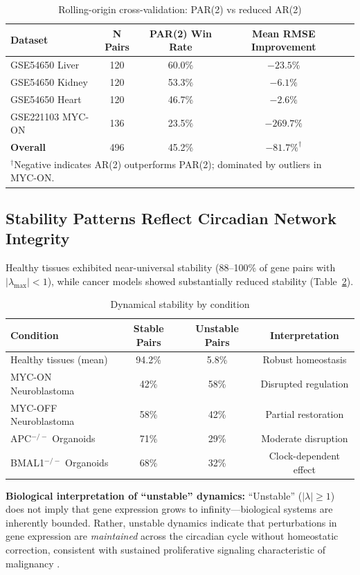 \documentclass[11pt,a4paper]{article}
\begin{document}
\begin{table}[H]
\centering
\caption{Rolling-origin cross-validation: PAR(2) vs reduced AR(2)}
\label{tab:cv_results}
\begin{tabular}{lcccc}
\toprule
Dataset & N Pairs & PAR(2) Win Rate & Mean RMSE Improvement \\
\midrule
GSE54650 Liver & 120 & 60.0\% & $-23.5\%$ \\
GSE54650 Kidney & 120 & 53.3\% & $-6.1\%$ \\
GSE54650 Heart & 120 & 46.7\% & $-2.6\%$ \\
GSE221103 MYC-ON & 136 & 23.5\% & $-269.7\%$ \\
\midrule
\textbf{Overall} & 496 & 45.2\% & $-81.7\%^{\dagger}$ \\
\bottomrule
\multicolumn{4}{l}{\footnotesize $^{\dagger}$Negative indicates AR(2) outperforms PAR(2); dominated by outliers in MYC-ON.}
\end{tabular}
\end{table}

\subsection{Stability Patterns Reflect Circadian Network Integrity}

Healthy tissues exhibited near-universal stability (88--100\% of gene pairs with $|\lambda_{\max}| < 1$), while cancer models showed substantially reduced stability (Table~\ref{tab:stability}).

\begin{table}[H]
\centering
\caption{Dynamical stability by condition}
\label{tab:stability}
\begin{tabular}{lccc}
\toprule
Condition & Stable Pairs & Unstable Pairs & Interpretation \\
\midrule
Healthy tissues (mean) & 94.2\% & 5.8\% & Robust homeostasis \\
MYC-ON Neuroblastoma & 42\% & 58\% & Disrupted regulation \\
MYC-OFF Neuroblastoma & 58\% & 42\% & Partial restoration \\
APC$^{-/-}$ Organoids & 71\% & 29\% & Moderate disruption \\
BMAL1$^{-/-}$ Organoids & 68\% & 32\% & Clock-dependent effect \\
\bottomrule
\end{tabular}
\end{table}

\textbf{Biological interpretation of ``unstable'' dynamics:} ``Unstable'' ($|\lambda| \geq 1$) does not imply that gene expression grows to infinity---biological systems are inherently bounded. Rather, unstable dynamics indicate that perturbations in gene expression are \textit{maintained} across the circadian cycle without homeostatic correction, consistent with sustained proliferative signaling characteristic of malignancy \citep{hanahan2011}.
\end{document}
